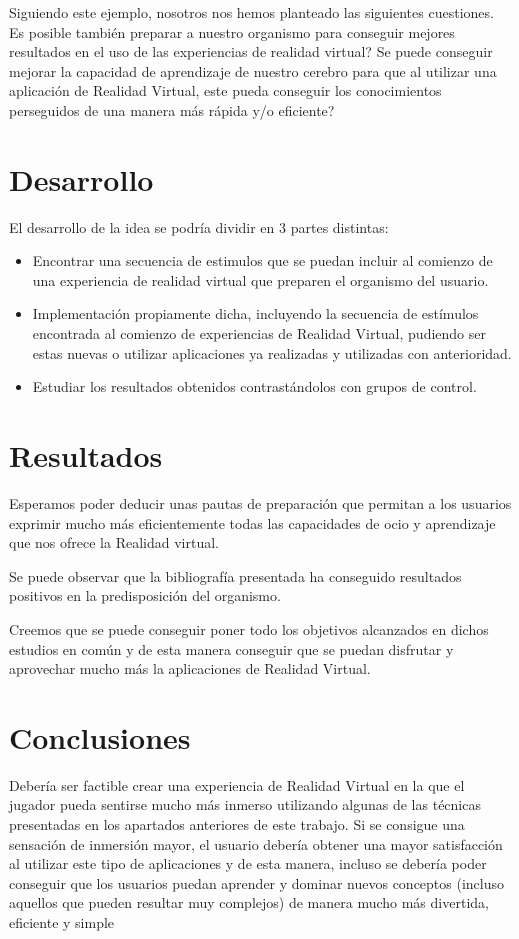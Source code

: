 \documentclass[twoside,twocolumn]{article}
\begin{document}
 Siguiendo este ejemplo, nosotros nos hemos planteado las siguientes cuestiones. Es posible tambi\'en preparar a nuestro organismo para conseguir mejores resultados en el uso de las experiencias de realidad virtual? Se puede conseguir mejorar la capacidad de aprendizaje de nuestro cerebro para que al utilizar una aplicaci\'on de Realidad Virtual, este pueda conseguir los conocimientos perseguidos de una manera m\'as r\'apida y/o eficiente?

\section{Desarrollo}

El desarrollo de la idea se podr\'ia dividir en 3 partes distintas:

\begin{itemize}
\item Encontrar una secuencia de estimulos que se puedan incluir al comienzo de una experiencia de realidad virtual que preparen el organismo del usuario.
\item Implementaci\'on propiamente dicha, incluyendo la secuencia de est\'imulos encontrada al comienzo de experiencias de Realidad Virtual, pudiendo ser estas nuevas o utilizar aplicaciones ya realizadas y utilizadas con anterioridad.
\item Estudiar los resultados obtenidos contrast\'andolos con grupos de control.
\end{itemize}

\section{Resultados}
Esperamos poder deducir unas pautas de preparaci\'on que permitan a los usuarios exprimir mucho m\'as eficientemente todas las capacidades de ocio y aprendizaje que nos ofrece la Realidad virtual.

Se puede observar que la bibliograf\'ia presentada ha conseguido resultados positivos en la predisposici\'on del organismo.


Creemos que se puede conseguir poner todo los objetivos alcanzados en dichos estudios en com\'un y de esta manera conseguir que se puedan disfrutar y aprovechar mucho m\'as la aplicaciones de Realidad Virtual.


\section{Conclusiones}

Deber\'ia ser factible crear una experiencia de Realidad Virtual en la que el jugador pueda sentirse mucho m\'as inmerso utilizando algunas de las t\'ecnicas presentadas en los apartados anteriores de este trabajo. Si se consigue una sensaci\'on de inmersi\'on mayor, el usuario deber\'ia obtener una mayor satisfacci\'on al utilizar este tipo de aplicaciones y de esta manera, incluso se deber\'ia poder conseguir que los usuarios puedan aprender y dominar nuevos conceptos (incluso aquellos que pueden resultar muy complejos) de manera mucho m\'as divertida, eficiente y simple

\medskip

\nocite{*}
\printbibliography
\end{document}
